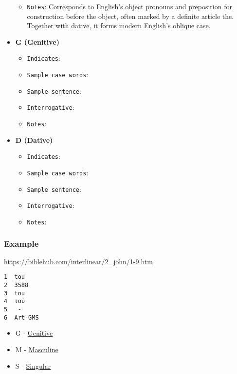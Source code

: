 \documentclass[11pt]{article}
\begin{document}
\begin{itemize}
\begin{itemize}
\item \texttt{Notes}: Corresponds to English's object pronouns and preposition for construction before the object, often marked by a definite article the. Together with dative, it forms modern English's oblique case.
\end{itemize}
\item \textbf{G (Genitive)}
\begin{itemize}
\item \texttt{Indicates}:
\item \texttt{Sample case words}:
\item \texttt{Sample sentence}:
\item \texttt{Interrogative}:
\item \texttt{Notes}:
\end{itemize}
\item \textbf{D (Dative)}
\begin{itemize}
\item \texttt{Indicates}:
\item \texttt{Sample case words}:
\item \texttt{Sample sentence}:
\item \texttt{Interrogative}:
\item \texttt{Notes}:
\end{itemize}
\end{itemize}

\subsubsection{Example}
\label{sec:orge3c61c5}
\url{https://biblehub.com/interlinear/2\_john/1-9.htm}

\begin{verbatim}
1  tou
2  3588
3  tou
4  τοῦ
5   -
6  Art-GMS
\end{verbatim}

\begin{itemize}
\item G - \href{https://en.wikipedia.org/wiki/Grammatical\_case}{Genitive}
\item M - \href{https://en.wikipedia.org/wiki/Grammatical\_case}{Masculine}
\item S - \href{https://en.wikipedia.org/wiki/Grammatical\_case}{Singular}
\end{itemize}
\end{document}
